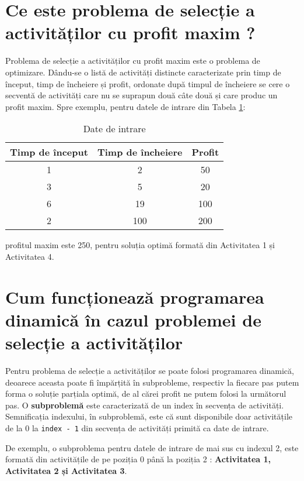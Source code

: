\section{Ce este problema de selecție a activităților cu profit maxim ?}
Problema de selecție a activităților cu profit maxim este o problema de optimizare. Dându-se o listă de activități distincte caracterizate prin timp de început, timp de încheiere și profit, ordonate după timpul de încheiere se cere o secventă de activități care nu se suprapun două câte două și care produc un profit maxim. 
Spre exemplu, pentru datele de intrare din Tabela \ref{tab:simple_table}:
\begin{table}[h]
\centering
\begin{tabular}{|c|c|c|}
\hline
Timp de început & Timp de încheiere  & Profit \\
\hline
1  &  2   & 50   \\
3   & 5   & 20   \\
6   & 19   & 100   \\
2 & 100 & 200 \\
\hline
\end{tabular}
\caption{Date de intrare}
\label{tab:simple_table}
\end{table}
profitul maxim este 250, pentru soluția optimă formată din Activitatea 1 și Activitatea 4.

\section{Cum funcționează programarea dinamică în cazul problemei de selecție a activităților}
Pentru problema de selecție a activităților se poate folosi programarea dinamică, deoarece aceasta poate fi împărțită în subprobleme, respectiv la fiecare pas putem forma o soluție parțiala optimă, de al cărei profit ne putem folosi la următorul pas. O \textbf{subproblemă} este caracterizată de un index în secvența de activități. Semnificația indexului, în subproblemă, este că sunt disponibile doar activitățile de la 0 la \texttt{index - 1} din secvența de activități primită ca date de intrare.

De exemplu, o subproblema pentru datele de intrare de mai sus cu indexul 2, este formată din activitățile de pe poziția 0 până la poziția 2 : \textbf{Activitatea 1, Activitatea 2 și Activitatea 3}. 

